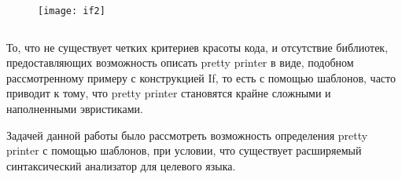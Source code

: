 \begin{figure}[h!]
	\begin{minipage}[b]{0.65\linewidth}
		\centering
		\texttt{[image: if2]}
		\caption{}
		\label{fig:ifImage2}
	\end{minipage}
	\hspace{0.5cm}
	\begin{minipage}[b]{0.25\linewidth}
		\centering
		\inputminted{haskell}{codes/ifCode2.hs}
		\caption{}
		\label{fig:ifCode2}
	\end{minipage}
\end{figure}

То, что не существует четких критериев красоты кода, и отсутствие библиотек, предоставляющих возможность описать pretty printer в виде, подобном
рассмотренному примеру с конструкцией If, то есть с помощью шаблонов, часто приводит к тому, что pretty printer становятся крайне сложными и наполненными эвристиками.

Задачей данной работы было рассмотреть возможность определения pretty printer с помощью шаблонов, при условии, что существует расширяемый синтаксический анализатор для целевого языка.